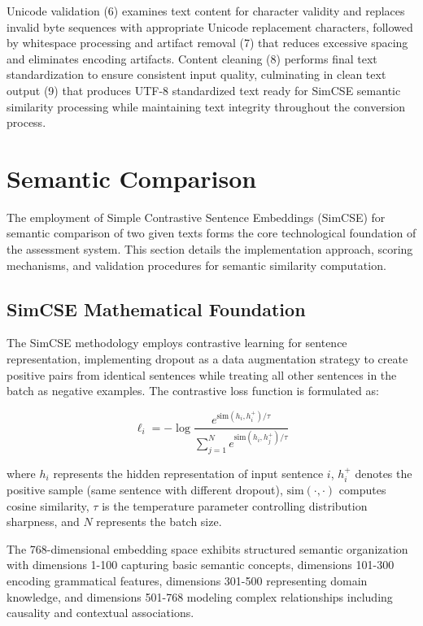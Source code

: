 {Unicode validation (6) examines text content for character validity and replaces invalid byte sequences with appropriate Unicode replacement characters, followed by whitespace processing and artifact removal (7) that reduces excessive spacing and eliminates encoding artifacts. Content cleaning (8) performs final text standardization to ensure consistent input quality, culminating in clean text output (9) that produces UTF-8 standardized text ready for SimCSE semantic similarity processing while maintaining text integrity throughout the conversion process.
}

{\color{maroon}
\section{Semantic Comparison}
\label{sec:semantic_comparison}

The employment of Simple Contrastive Sentence Embeddings (SimCSE) for semantic comparison of two given texts forms the core technological foundation of the assessment system. This section details the implementation approach, scoring mechanisms, and validation procedures for semantic similarity computation.

\subsection{SimCSE Mathematical Foundation}

The SimCSE methodology employs contrastive learning for sentence representation, implementing dropout as a data augmentation strategy to create positive pairs from identical sentences while treating all other sentences in the batch as negative examples. The contrastive loss function is formulated as:

\begin{equation}
\ell_i = -\log \frac{e^{\text{sim}(h_i, h_i^+)/\tau}}{\sum_{j=1}^{N} e^{\text{sim}(h_i, h_j^+)/\tau}}
\end{equation}

where $h_i$ represents the hidden representation of input sentence $i$, $h_i^+$ denotes the positive sample (same sentence with different dropout), $\text{sim}(\cdot,\cdot)$ computes cosine similarity, $\tau$ is the temperature parameter controlling distribution sharpness, and $N$ represents the batch size.

The 768-dimensional embedding space exhibits structured semantic organization with dimensions 1-100 capturing basic semantic concepts, dimensions 101-300 encoding grammatical features, dimensions 301-500 representing domain knowledge, and dimensions 501-768 modeling complex relationships including causality and contextual associations.

}
